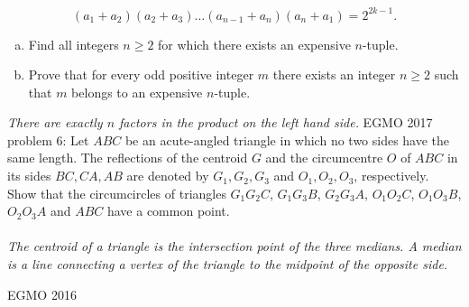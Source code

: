 \[ (a_1+a_2)(a_2+a_3)\dots(a_{n-1}+a_n)(a_n+a_1)=2^{2k-1}. \]
\begin{enumerate}[a)]
  \item Find all integers $n\geq2$ for which there exists an expensive $n$-tuple.
  \item Prove that for every odd positive integer $m$ there exists an integer $n\geq2$ such that $m$ belongs to an expensive $n$-tuple.
\end{enumerate}
\textit{There are exactly $n$ factors in the product on the left hand side.} 
EGMO 2017 problem 6:  Let $ABC$ be an acute-angled triangle in which no two sides have the same length. The reflections of the centroid $G$ and the circumcentre $O$ of $ABC$ in its sides $BC,CA,AB$ are denoted by $G_1,G_2,G_3$ and $O_1,O_2,O_3$, respectively. Show that the circumcircles of triangles $G_1G_2C$, $G_1G_3B$, $G_2G_3A$, $O_1O_2C$, $O_1O_3B$, $O_2O_3A$ and $ABC$ have a common point. \\\\
\textit{The centroid of a triangle is the intersection point of the three medians. A median is a line connecting a vertex of the triangle to the midpoint of the opposite side.} 

EGMO 2016 


